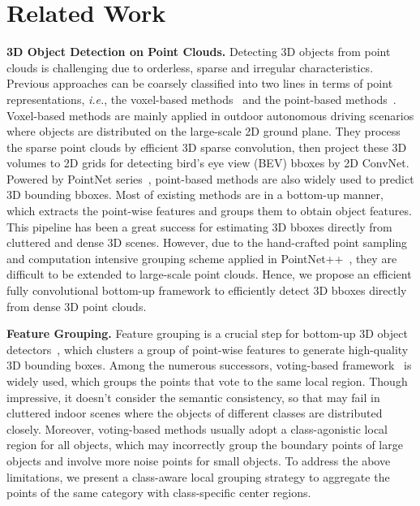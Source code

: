 \documentclass{article}
\begin{document}
\section{Related Work}
\textbf{3D Object Detection on Point Clouds.} Detecting 3D objects from point clouds is challenging due to orderless, sparse and irregular characteristics. Previous approaches can be coarsely classified into two lines in terms of point representations, \textit{i.e.}, the voxel-based methods~\cite{zhou2018voxelnet,yang2018pixor,shi2020p2,yan2018second,shi2020pv,yin2021cvpr,shi2020p2} and the point-based methods~\cite{qi2019deep,wang2022rbgnet,cheng2021back,liu2021group,zhang2020h3dnet,yang2022boosting}.  Voxel-based methods are mainly applied in outdoor autonomous driving scenarios where objects are distributed on the large-scale 2D ground plane. They process the sparse point clouds by efficient 3D sparse convolution, then project these 3D volumes to 2D grids for detecting bird's eye view (BEV) bboxes by 2D ConvNet. Powered by PointNet series~\cite{qi2017pointnet,qi2018pointnnetplus}, point-based methods are also widely used to predict 3D bounding bboxes. Most of existing methods are in a bottom-up manner, which extracts the point-wise features and groups them to obtain object features. This pipeline has been a great success for estimating 3D bboxes directly from cluttered and dense 3D scenes. However, due to the hand-crafted point sampling and computation intensive grouping scheme applied in PointNet++~\cite{qi2018pointnnetplus}, they are difficult to be extended to large-scale point clouds. Hence, we propose an efficient fully convolutional bottom-up framework to efficiently detect 3D bboxes directly from dense 3D point clouds.

\textbf{Feature Grouping.} Feature grouping is a crucial step for bottom-up 3D object detectors~\cite{qi2019deep,wang2022rbgnet,liu2021group,cheng2021back,zhang2020h3dnet,vu2022softgroup}, which clusters a group of point-wise features to generate high-quality 3D bounding boxes. Among the numerous successors, voting-based framework~\cite{qi2019deep} is widely used, which groups the points that vote to the same local region. Though impressive, it doesn't consider the semantic consistency, so that may fail in cluttered indoor scenes where the objects of different classes are distributed closely. Moreover, voting-based methods usually adopt a class-agonistic local region for all objects, which may incorrectly group the boundary points of large objects and involve more noise points for small objects. To address the above limitations, we present a class-aware local grouping strategy to aggregate the points of the same category with class-specific center regions.
 
\end{document}
